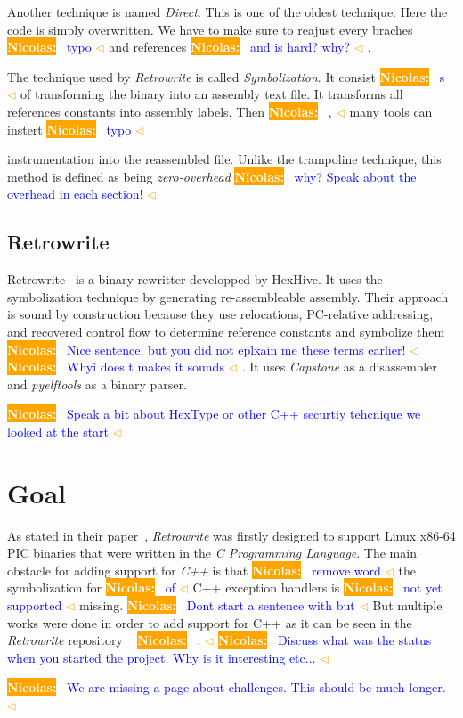 \documentclass[a4paper,11pt,oneside]{report}
\newcommand{\todobox}[3]{%
	\colorbox{#1}{\textcolor{white}{\sffamily\bfseries\scriptsize #2}}%
	~\textcolor{blue}{#3} %
	\textcolor{#1}{$\triangleleft$}%
}
\newcommand{\nb}[1]{\todobox{orange}{Nicolas:}{#1}}
\begin{document}
Another technique is named \textit{Direct}. This is one of the oldest
technique. Here the code is simply overwritten. We have to make sure to reajust
every braches\nb{typo} and references\nb{and is hard? why?}.


The technique used by \textit{Retrowrite} is called \textit{Symbolization}. It
consist\nb{s} of transforming the binary into an assembly text file. It transforms
all references constants into assembly labels. Then\nb{,} many tools can instert\nb{typo}
instrumentation into the reassembled file. Unlike the trampoline technique,
this method is defined as being \textit{zero-overhead} \nb{why? Speak about the
overhead in each section!}

\section{Retrowrite}
Retrowrite~\cite{dinesh20oakland} is a binary rewritter developped by HexHive. It uses the
symbolization technique by generating re-assembleable assembly. Their approach
is sound by construction because they use relocations, PC-relative addressing,
and recovered control flow to determine reference constants and symbolize
them\nb{Nice sentence, but you did not eplxain me these terms earlier!}\nb{Whyi
does t makes it sounds}.
It uses \textit{Capstone} as a disassembler and \textit{pyelftools} as a binary
parser.

\nb{Speak a bit about HexType or other C++ securtiy tehcnique we looked at the start}


\chapter{Goal}
As stated in their paper~\cite{dinesh20oakland}, \textit{Retrowrite} was
firstly designed to support Linux x86-64 PIC binaries that were written in the
\textit{C Programming Language}.
The main obstacle for adding support for \textit{C++} is that \nb{remove word}the symbolization
for \nb{of}C++ exception handlers is \nb{not yet supported} missing. \nb{Dont
start a sentence with but}But multiple works were done in order to
add support for C++ as it can be seen in the \textit{Retrowrite} repository
~\cite{gitCommit} \nb{.} \nb{Discuss what was the status when you started the
project. Why is it interesting etc...}


\nb{We are missing a page about challenges. This should be much longer.}
\end{document}
